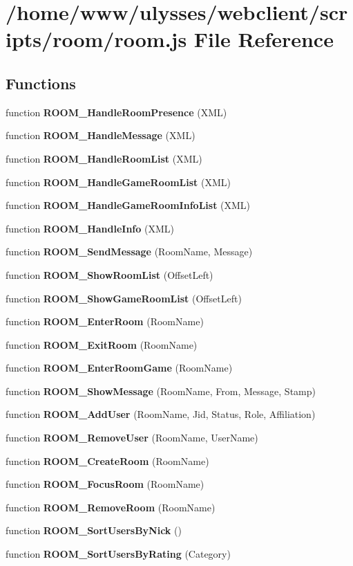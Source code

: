 \section{/home/www/ulysses/webclient/scripts/room/room.js File Reference}
\label{room_2room_8js}
\subsection*{Functions}
\begin{CompactItemize}
\item 
function {\bf ROOM\_\-HandleRoomPresence} (XML)
\item 
function {\bf ROOM\_\-HandleMessage} (XML)
\item 
function {\bf ROOM\_\-HandleRoomList} (XML)
\item 
function {\bf ROOM\_\-HandleGameRoomList} (XML)
\item 
function {\bf ROOM\_\-HandleGameRoomInfoList} (XML)
\item 
function {\bf ROOM\_\-HandleInfo} (XML)
\item 
function {\bf ROOM\_\-SendMessage} (RoomName, Message)
\item 
function {\bf ROOM\_\-ShowRoomList} (OffsetLeft)
\item 
function {\bf ROOM\_\-ShowGameRoomList} (OffsetLeft)
\item 
function {\bf ROOM\_\-EnterRoom} (RoomName)
\item 
function {\bf ROOM\_\-ExitRoom} (RoomName)
\item 
function {\bf ROOM\_\-EnterRoomGame} (RoomName)
\item 
function {\bf ROOM\_\-ShowMessage} (RoomName, From, Message, Stamp)
\item 
function {\bf ROOM\_\-AddUser} (RoomName, Jid, Status, Role, Affiliation)
\item 
function {\bf ROOM\_\-RemoveUser} (RoomName, UserName)
\item 
function {\bf ROOM\_\-CreateRoom} (RoomName)
\item 
function {\bf ROOM\_\-FocusRoom} (RoomName)
\item 
function {\bf ROOM\_\-RemoveRoom} (RoomName)
\item 
function {\bf ROOM\_\-SortUsersByNick} ()
\item 
function {\bf ROOM\_\-SortUsersByRating} (Category)
\end{CompactItemize}


